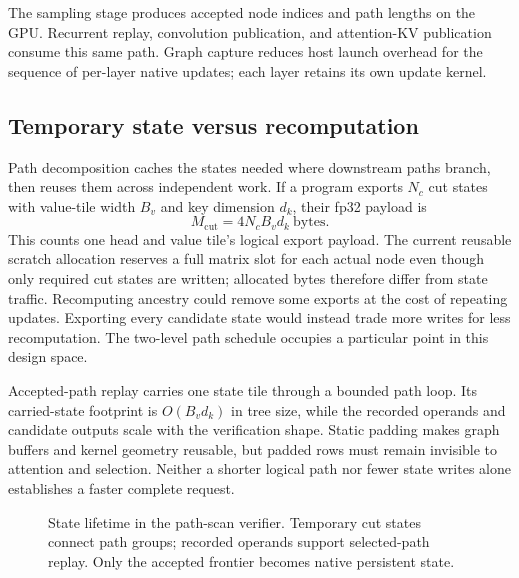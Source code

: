 \documentclass[conference]{IEEEtran}
\begin{document}
The sampling stage produces accepted node indices and path lengths on the GPU. Recurrent replay, convolution publication, and attention-KV publication consume this same path. Graph capture reduces host launch overhead for the sequence of per-layer native updates; each layer retains its own update kernel.

\subsection{Temporary state versus recomputation}
Path decomposition caches the states needed where downstream paths branch, then reuses them across independent work. If a program exports $N_c$ cut states with value-tile width $B_v$ and key dimension $d_k$, their fp32 payload is
\begin{equation}
 M_{\mathrm{cut}}=4N_cB_vd_k\ \text{bytes}.
\end{equation}
This counts one head and value tile's logical export payload. The current reusable scratch allocation reserves a full matrix slot for each actual node even though only required cut states are written; allocated bytes therefore differ from state traffic. Recomputing ancestry could remove some exports at the cost of repeating updates. Exporting every candidate state would instead trade more writes for less recomputation. The two-level path schedule occupies a particular point in this design space.

Accepted-path replay carries one state tile through a bounded path loop. Its carried-state footprint is $O(B_vd_k)$ in tree size, while the recorded operands and candidate outputs scale with the verification shape. Static padding makes graph buffers and kernel geometry reusable, but padded rows must remain invisible to attention and selection. Neither a shorter logical path nor fewer state writes alone establishes a faster complete request.

\begin{figure}[t]
\centering

\caption{State lifetime in the path-scan verifier. Temporary cut states connect path groups; recorded operands support selected-path replay. Only the accepted frontier becomes native persistent state.}
\label{fig:scan-replay}
\end{figure}
\end{document}

